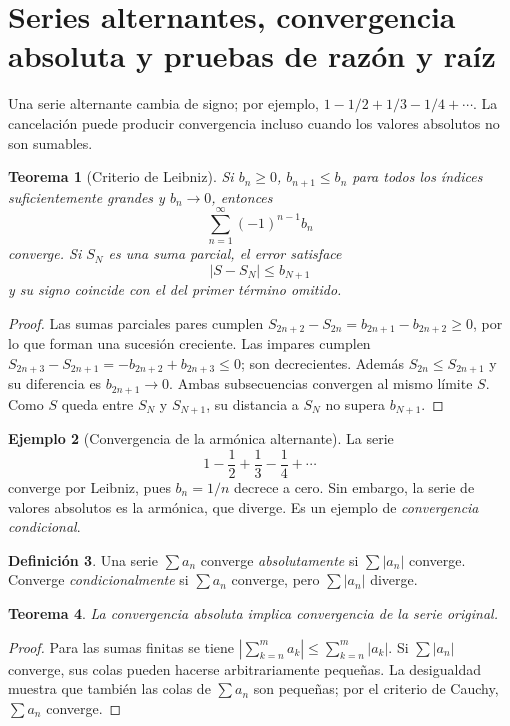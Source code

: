 \documentclass[12pt]{article}
\newtheorem{teorema}{Teorema}[section]
\theoremstyle{definition}
\newtheorem{definicion}[teorema]{Definición}
\newtheorem{ejemplo}[teorema]{Ejemplo}
\theoremstyle{remark}
\begin{document}
\section{Series alternantes, convergencia absoluta y pruebas de razón y raíz}
Una serie alternante cambia de signo; por ejemplo, $1-1/2+1/3-1/4+\cdots$. La cancelación puede producir convergencia incluso cuando los valores absolutos no son sumables.
\begin{teorema}[Criterio de Leibniz]
Si $b_n\ge0$, $b_{n+1}\le b_n$ para todos los índices suficientemente grandes y $b_n\to0$, entonces
\[\sum_{n=1}^\infty(-1)^{n-1}b_n\]
converge. Si $S_N$ es una suma parcial, el error satisface
\[\boxed{|S-S_N|\le b_{N+1}}\]
y su signo coincide con el del primer término omitido.
\end{teorema}
\begin{proof}
Las sumas parciales pares cumplen $S_{2n+2}-S_{2n}=b_{2n+1}-b_{2n+2}\ge0$, por lo que forman una sucesión creciente. Las impares cumplen $S_{2n+3}-S_{2n+1}=-b_{2n+2}+b_{2n+3}\le0$; son decrecientes. Además $S_{2n}\le S_{2n+1}$ y su diferencia es $b_{2n+1}\to0$. Ambas subsecuencias convergen al mismo límite $S$. Como $S$ queda entre $S_N$ y $S_{N+1}$, su distancia a $S_N$ no supera $b_{N+1}$.
\end{proof}
\begin{ejemplo}[Convergencia de la armónica alternante]
La serie
\[1-\frac12+\frac13-\frac14+\cdots\]
converge por Leibniz, pues $b_n=1/n$ decrece a cero. Sin embargo, la serie de valores absolutos es la armónica, que diverge. Es un ejemplo de \emph{convergencia condicional}.
\end{ejemplo}
\begin{definicion}
Una serie $\sum a_n$ converge \emph{absolutamente} si $\sum|a_n|$ converge. Converge \emph{condicionalmente} si $\sum a_n$ converge, pero $\sum|a_n|$ diverge.
\end{definicion}
\begin{teorema}
La convergencia absoluta implica convergencia de la serie original.
\end{teorema}
\begin{proof}
Para las sumas finitas se tiene $|\sum_{k=n}^m a_k|\le\sum_{k=n}^m|a_k|$. Si $\sum|a_n|$ converge, sus colas pueden hacerse arbitrariamente pequeñas. La desigualdad muestra que también las colas de $\sum a_n$ son pequeñas; por el criterio de Cauchy, $\sum a_n$ converge.
\end{proof}
\end{document}
